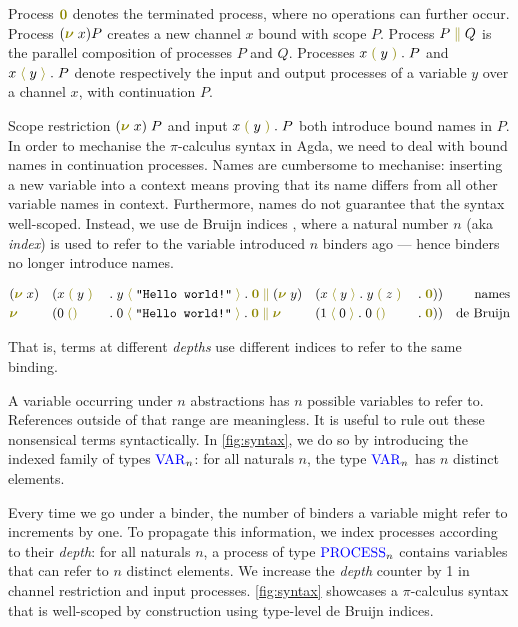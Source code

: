 \documentclass[a4paper,UKenglish,cleveref, autoref, thm-restate,authorcolumns]{lipics-v2019}
\theoremstyle{definition}
\newcommand{\picalc}{$\pi$-calculus}
\newcommand{\type}[1]{\textcolor{blue}{\operatorname{#1}}}
\newcommand{\constr}[1]{\textcolor{olive}{\operatorname{#1}}}
\newcommand{\PO}{\constr{\mathbf{0}}}
\newcommand{\comp}[2]{#1 \; \constr{\parallel} \; #2}
\newcommand{\new}{\constr{\boldsymbol{\nu}} \;}
\newcommand{\send}[2]{#1 \; \constr{\langle} \; #2 \;\constr{\rangle} \;}
\newcommand{\sendp}[2]{#1 \; \constr{\langle} \; #2 \; \constr{\rangle} \;}
\newcommand{\recv}[1]{#1 \; \constr{\mathbb{()}} \;}
\newcommand{\recvp}[2]{#1 \; \constr{(} \; #2 \; \constr{)} \;}
\newcommand{\Var}{\type{VAR}}
\newcommand{\Process}{\type{PROCESS}}
\begin{document}
Process $\PO$ denotes the terminated process, where no operations can further occur.
Process $(\new{}x)P$ creates a new channel $x$ bound with scope $P$.
Process $\comp{P}{Q}$ is the parallel composition of processes $P$ and $Q$.
Processes $\recvp{x}{y}. \; P$ and $\sendp{x}{y}. \; P$ denote respectively the input and output processes of a variable $y$ over a channel $x$, with continuation $P$.

Scope restriction $(\new{}x) \; P$ and input $\recvp{x}{y}. \; P$ both introduce bound names in $P$.
In order to mechanise the \picalc{} syntax in Agda, we need to deal with bound names in continuation processes.
Names are cumbersome to mechanise: inserting a new variable into a context means proving that its name differs from all other variable names in context.
Furthermore, names do not guarantee that the syntax well-scoped.
Instead, we use de Bruijn indices \cite{deBruijn1972}, where a natural number $n$ (aka \emph{index}) is used to refer to the variable introduced $n$ binders ago --- hence binders no longer introduce names.
\begin{example}
  \begin{equation*}
    \begin{split}
      & (\new{}x ) && (\comp {\recvp{x}{y} && . \; \sendp{y}{\texttt{"Hello world!"}} . \; \PO} {(\new{} y) && (\sendp{x}{y} . \; \recvp{y}{z} && . \; \PO)})
      & \text{names}
      \\
      & \new{} && (\comp {\recv{0} && . \; \send{0}{\texttt{"Hello world!"}} . \; \PO} {\new{} && (\send{1}{0} . \; \recv{0} && . \; \PO)})
      & \text{de Bruijn}
      \\
    \end{split}
  \end{equation*}
\end{example}
That is, terms at different \emph{depths} use different indices to refer to the same binding.

A variable occurring under $n$ abstractions has $n$ possible variables to refer to.
References outside of that range are meaningless.
It is useful to rule out these nonsensical terms syntactically.
In \autoref{fig:syntax}, we do so by introducing the indexed family of types $\Var_n$: for all naturals $n$, the type $\Var_n$ has $n$ distinct elements.


Every time we go under a binder, the number of binders a variable might refer to increments by one.
To propagate this information, we index processes according to their \emph{depth}: for all naturals $n$, a process of type $\Process_n$ contains variables that can refer to $n$ distinct elements.
We increase the \emph{depth} counter by 1 in channel restriction and input processes.
\autoref{fig:syntax} showcases a \picalc{} syntax that is well-scoped by construction using type-level de Bruijn indices.
\end{document}
